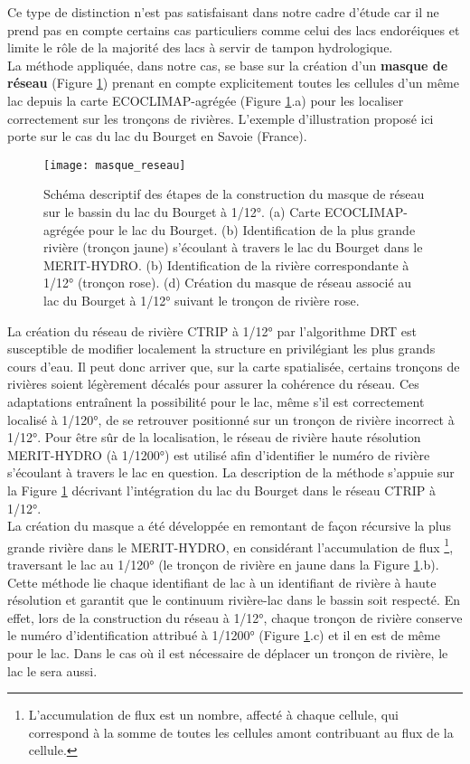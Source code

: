Ce type de distinction n'est pas satisfaisant dans notre cadre d'étude car il ne prend pas en compte certains cas particuliers comme celui des lacs endoréiques et limite le rôle de la majorité des lacs à servir de tampon hydrologique. \\
\noindent La méthode appliquée, dans notre cas, se base sur la création d'un \textbf{masque de réseau} (Figure \ref{masque_reseau}) prenant en compte explicitement toutes les cellules d'un même lac depuis la carte ECOCLIMAP-agrégée (Figure \ref{masque_reseau}.a) pour les localiser correctement sur les tronçons de rivières. L'exemple d'illustration proposé ici porte sur le cas du lac du Bourget en Savoie (France).\\

\begin{figure}[!h]
\centering
       \texttt{[image: masque\_reseau]}
     \caption{Schéma descriptif des étapes de la construction du masque de réseau sur le bassin du lac du Bourget à 1/12°. (a) Carte ECOCLIMAP-agrégée pour le lac du Bourget. (b) Identification de la plus grande rivière (tronçon jaune) s'écoulant à travers le lac du Bourget dans le MERIT-HYDRO. (b) Identification de la rivière correspondante à 1/12° (tronçon rose). (d) Création du masque de réseau associé au lac du Bourget à 1/12° suivant le tronçon de rivière rose.}
     \label{masque_reseau}
\end{figure}

\noindent La création du réseau de rivière CTRIP à 1/12° par l'algorithme DRT est susceptible de modifier localement la structure en privilégiant les plus grands cours d'eau. Il peut donc arriver que, sur la carte spatialisée, certains tronçons de rivières soient légèrement décalés pour assurer la cohérence du réseau. Ces adaptations entraînent la possibilité pour le lac, même s'il est correctement localisé à 1/120°, de se retrouver positionné sur un tronçon de rivière incorrect à 1/12°. Pour être sûr de la localisation, le réseau de rivière haute résolution MERIT-HYDRO (à 1/1200°) est utilisé afin d'identifier le numéro de rivière s'écoulant à travers le lac en question. La description de la méthode s'appuie sur la Figure \ref{masque_reseau} décrivant l'intégration du lac du Bourget dans le réseau CTRIP à 1/12°.\\
La création du masque a été développée en remontant de façon récursive la plus grande rivière dans le MERIT-HYDRO, en considérant l'accumulation de flux \footnote{L'accumulation de flux est un nombre, affecté à chaque cellule, qui correspond à la somme de toutes les cellules amont contribuant au flux de la cellule.}, traversant le lac au 1/120° (le tronçon de rivière en jaune dans la Figure \ref{masque_reseau}.b). Cette méthode lie chaque identifiant de lac à un identifiant de rivière à haute résolution et garantit que le continuum rivière-lac dans le bassin soit respecté. En effet, lors de la construction du réseau à 1/12°, chaque tronçon de rivière conserve le numéro d'identification attribué à 1/1200° (Figure \ref{masque_reseau}.c) et il en est de même pour le lac. Dans le cas où il est nécessaire de déplacer un tronçon de rivière, le lac le sera aussi.\\ 

